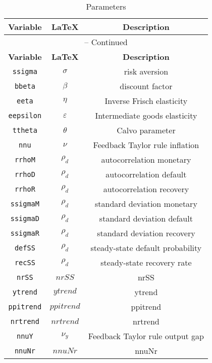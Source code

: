 \begin{center}
\begin{longtable}{ccc}
\caption{Parameters}\\%
\hline%
\multicolumn{1}{c}{\textbf{Variable}} &
\multicolumn{1}{c}{\textbf{\LaTeX}} &
\multicolumn{1}{c}{\textbf{Description}}\\%
\hline\hline%
\endfirsthead
\multicolumn{3}{c}{{\tablename} \thetable{} -- Continued}\\%
\hline%
\multicolumn{1}{c}{\textbf{Variable}} &
\multicolumn{1}{c}{\textbf{\LaTeX}} &
\multicolumn{1}{c}{\textbf{Description}}\\%
\hline\hline%
\endhead
\texttt{ssigma} & $\sigma$ & risk aversion\\
\texttt{bbeta} & $\beta$ & discount factor\\
\texttt{eeta} & $\eta$ & Inverse Frisch elasticity\\
\texttt{eepsilon} & $\varepsilon$ & Intermediate goods elasticity\\
\texttt{ttheta} & $\theta$ & Calvo parameter\\
\texttt{nnu} & $\nu$ & Feedback Taylor rule inflation\\
\texttt{rrhoM} & $\rho_d$ & autocorrelation monetary\\
\texttt{rrhoD} & $\rho_d$ & autocorrelation default\\
\texttt{rrhoR} & $\rho_d$ & autocorrelation recovery\\
\texttt{ssigmaM} & $\rho_d$ & standard deviation monetary\\
\texttt{ssigmaD} & $\rho_d$ & standard deviation default\\
\texttt{ssigmaR} & $\rho_d$ & standard deviation recovery\\
\texttt{defSS} & $\rho_d$ & steady-state default probability\\
\texttt{recSS} & $\rho_d$ & steady-state recovery rate\\
\texttt{nrSS} & $nrSS$ & nrSS\\
\texttt{ytrend} & $ytrend$ & ytrend\\
\texttt{ppitrend} & $ppitrend$ & ppitrend\\
\texttt{nrtrend} & $nrtrend$ & nrtrend\\
\texttt{nnuY} & $\nu_y$ & Feedback Taylor rule output gap\\
\texttt{nnuNr} & $nnuNr$ & nnuNr\\
\hline%
\end{longtable}
\end{center}
